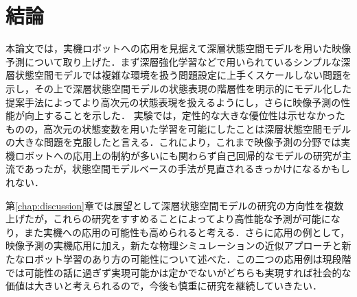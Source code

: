 \chapter{結論}
\label{chap:conclusion}

本論文では，実機ロボットへの応用を見据えて深層状態空間モデルを用いた映像予測について取り上げた．まず深層強化学習などで用いられているシンプルな深層状態空間モデルでは複雑な環境を扱う問題設定に上手くスケールしない問題を示し，その上で深層状態空間モデルの状態表現の階層性を明示的にモデル化した提案手法によってより高次元の状態表現を扱えるようにし，さらに映像予測の性能が向上することを示した．
実験では，定性的な大きな優位性は示せなかったものの，高次元の状態変数を用いた学習を可能にしたことは深層状態空間モデルの大きな問題を克服したと言える．これにより，これまで映像予測の分野では実機ロボットへの応用上の制約が多いにも関わらず自己回帰的なモデルの研究が主流であったが，状態空間モデルベースの手法が見直されるきっかけになるかもしれない．

第\ref{chap:discussion}章では展望として深層状態空間モデルの研究の方向性を複数上げたが，これらの研究をすすめることによってより高性能な予測が可能になり，また実機への応用の可能性も高められると考える．さらに応用の例として，映像予測の実機応用に加え，新たな物理シミュレーションの近似アプローチと新たなロボット学習のあり方の可能性について述べた．この二つの応用例は現段階では可能性の話に過ぎず実現可能かは定かでないがどちらも実現すれば社会的な価値は大きいと考えられるので，今後も慎重に研究を継続していきたい．
